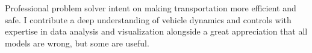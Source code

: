 
\begin{cvparagraph}
Professional problem solver intent on making transportation more efficient and safe.
I contribute a deep understanding of vehicle dynamics and controls with expertise in data analysis and visualization alongside a great appreciation that all models are wrong, but some are useful.
\end{cvparagraph}
